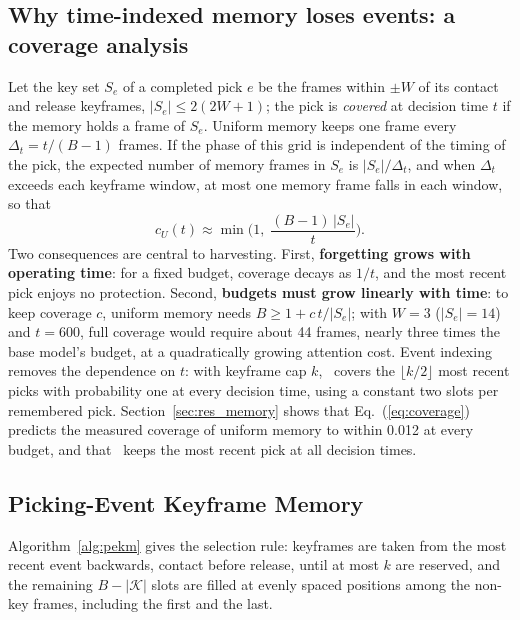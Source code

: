 \subsection{Why time-indexed memory loses events: a coverage analysis}
\label{sec:coverage}
Let the key set $S_e$ of a completed pick $e$ be the frames within $\pm W$ of its contact and release keyframes, $|S_e| \le 2(2W+1)$; the pick is \emph{covered} at decision time $t$ if the memory holds a frame of $S_e$. Uniform memory keeps one frame every $\Delta_t = t/(B-1)$ frames. If the phase of this grid is independent of the timing of the pick, the expected number of memory frames in $S_e$ is $|S_e|/\Delta_t$, and when $\Delta_t$ exceeds each keyframe window, at most one memory frame falls in each window, so that
\begin{equation}
c_U(t) \approx \min\!\Big(1,\; \frac{(B-1)\,|S_e|}{t}\Big).
\label{eq:coverage}
\end{equation}
Two consequences are central to harvesting. First, \textbf{forgetting grows with operating time}: for a fixed budget, coverage decays as $1/t$, and the most recent pick enjoys no protection. Second, \textbf{budgets must grow linearly with time}: to keep coverage $c$, uniform memory needs $B \ge 1 + c\,t/|S_e|$; with $W=3$ ($|S_e|=14$) and $t=600$, full coverage would require about 44 frames, nearly three times the base model's budget, at a quadratically growing attention cost. Event indexing removes the dependence on $t$: with keyframe cap $k$, \pekm\ covers the $\lfloor k/2\rfloor$ most recent picks with probability one at every decision time, using a constant two slots per remembered pick. Section~\ref{sec:res_memory} shows that Eq.~(\ref{eq:coverage}) predicts the measured coverage of uniform memory to within 0.012 at every budget, and that \pekm\ keeps the most recent pick at all decision times.

\subsection{Picking-Event Keyframe Memory}
\label{sec:pekm}
Algorithm~\ref{alg:pekm} gives the selection rule: keyframes are taken from the most recent event backwards, contact before release, until at most $k$ are reserved, and the remaining $B-|\mathcal{K}|$ slots are filled at evenly spaced positions among the non-key frames, including the first and the last.

